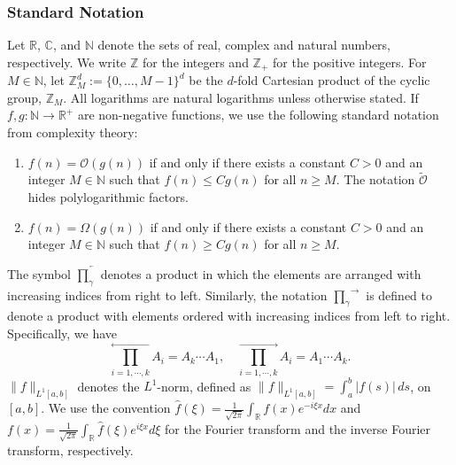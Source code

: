\documentclass[10pt,reqno]{article}
\numberwithin{equation}{section}
\theoremstyle{plain}
\theoremstyle{definition}
\newcommand{\Z}{\mathbb{Z}}
\begin{document}
\subsubsection{Standard Notation} 
Let $\mathbb{R}$, $\mathbb{C}$, and $\mathbb{N}$ denote the sets of real, complex and natural numbers, respectively. We write \(\mathbb{Z}\) for the integers and \(\mathbb{Z}_{+}\) for the positive integers. For \(M \in \mathbb{N}\), let \(\Z^d_M := \{0,\ldots,M-1\}^d\) be the $d$-fold Cartesian product of the cyclic group, $\Z_M$. All logarithms are natural logarithms unless otherwise stated. If $f, g : \mathbb{N} \to \mathbb{R}^+$ are non-negative functions, we use the following standard notation from complexity theory:
\begin{enumerate}
\item $f(n) = \mathcal{O}(g(n))$ if and only if there exists a constant $C > 0$ and an integer $M \in \mathbb{N}$ such that $f(n) \leq C g(n)$ for all $n \geq M$. The notation $\widetilde{\mathcal O}$ hides polylogarithmic factors.
\item $f(n) = \Omega(g(n))$ if and only if there exists a constant $C > 0$ and an integer $M \in \mathbb{N}$ such that $f(n) \geq C g(n)$ for all $n \geq M$.
\end{enumerate}
The symbol \(\overleftarrow{\prod_{\gamma}}\) denotes a product in which the elements are arranged with increasing indices from right to left. Similarly, the notation \(\overrightarrow{\prod_{\gamma}}\) is defined to denote a product with elements ordered with increasing indices from left to right. Specifically, we have
\begin{equation}
\overset{\longleftarrow}{\prod_{i=1,\cdots,k}} A_i = A_k \cdots A_1, \quad \overset{\longrightarrow}{\prod_{i=1,\cdots,k}} A_i = A_1 \cdots A_k.
\end{equation}
$\| f \|_{L^1[a,b]}$ denotes the $L^1$-norm, defined as $\|f\|_{L^1[a,b]} = \int_a^b |f(s)| \, ds$, on $[a,b]$. We use the convention $\hat{f}(\xi) = \frac{1}{\sqrt{2\pi}} \int_{\mathbb{R}} f(x) e^{-i \xi x} dx$ and $f(x) = \frac{1}{\sqrt{2\pi}} \int_{\mathbb{R}} \hat{f}(\xi) e^{i \xi x} d\xi$ for the Fourier transform and the inverse Fourier transform, respectively.
\end{document}
